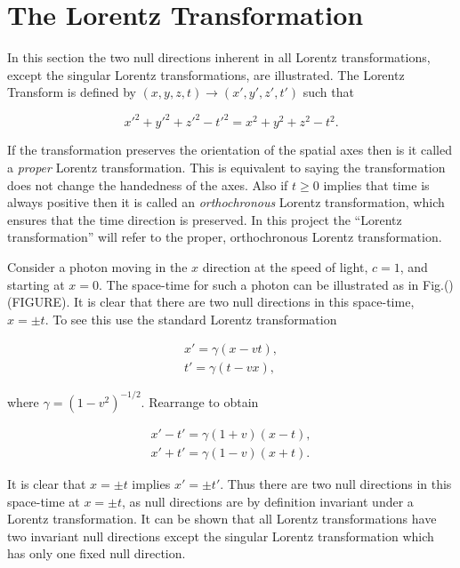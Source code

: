 \section{The Lorentz Transformation}

In this section the two null directions inherent in all Lorentz transformations, except the singular Lorentz transformations, are illustrated. The Lorentz Transform is defined by $(x,y,z,t) \rightarrow (x',y',z',t')$ such that

\begin{equation*}
{x'}^2 + {y'}^2 + {z'}^2 - {t'}^2 = x^2 + y^2 + z^2 - t^2.
\end{equation*}

\noindent If the transformation preserves the orientation of the spatial axes then is it called a \textit{proper} Lorentz transformation. This is equivalent to saying the transformation does not change the handedness of the axes. Also if $t \geq 0$ implies that time is always positive then it is called an \textit{orthochronous} Lorentz transformation, which ensures that the time direction is preserved. In this project the ``Lorentz transformation'' will refer to the proper, orthochronous Lorentz transformation.

Consider a photon moving in the $x$ direction at the speed of light, $c = 1$, and starting at $x = 0$. The space-time for such a photon can be illustrated as in Fig.() (FIGURE). It is clear that there are two null directions in this space-time, $x = \pm t$. To see this use the standard Lorentz transformation

\begin{align*}
x'  = \gamma (x - vt),  \\
t'  = \gamma (t - vx),
\end{align*}

\noindent where $\gamma = {(1 - v^2)}^{-1/2}$. Rearrange to obtain

\begin{eqnarray*}
x' - t' = \gamma (1 + v) (x - t), \\
x' + t' = \gamma (1 - v) (x + t).
\end{eqnarray*}

\noindent It is clear that $x = \pm t$ implies $x' = \pm t'$. Thus there are two null directions in this space-time at $x = \pm t$, as null directions are by definition invariant under a Lorentz transformation. It can be shown that all Lorentz transformations have two invariant null directions except the singular Lorentz transformation which has only one fixed null direction.  
